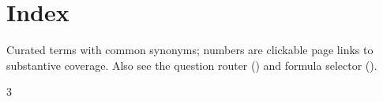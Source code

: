 \section{Index}\label{sec:index}
Curated terms with common synonyms; numbers are clickable page links to substantive coverage. Also see the question router () and formula selector ().

\newcommand{\idxletter}[1]{\par\vspace{2pt}{\textsf{\textbf{#1}}}\par\nopagebreak}
\newcommand{\idxitem}[2]{\par\hangindent=1em\hangafter=1 #1\enspace\dotfill\enspace #2}
\begin{multicols}{3}
\small
\setlength{\parskip}{0.3pt}
\raggedright
{}
\end{multicols}
